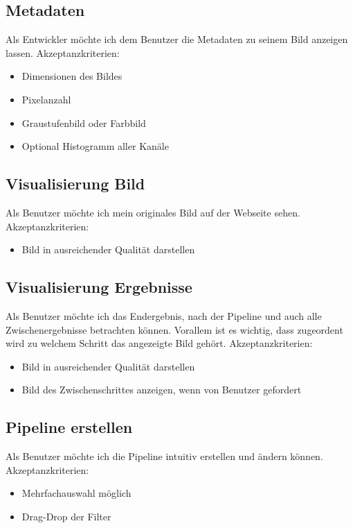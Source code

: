\documentclass[conference]{IEEEtran}
\begin{document}
\subsection{Metadaten}
Als Entwickler möchte ich dem Benutzer die Metadaten zu seinem Bild anzeigen lassen.
Akzeptanzkriterien: 
\begin{itemize}
	\item Dimensionen des Bildes
	\item Pixelanzahl
	\item Graustufenbild oder Farbbild
	\item Optional Histogramm aller Kanäle
\end{itemize}

\subsection{Visualisierung Bild}
Als Benutzer möchte ich mein originales Bild auf der Webseite sehen.
Akzeptanzkriterien: 
\begin{itemize}
	\item Bild in ausreichender Qualität darstellen
\end{itemize}

\subsection{Visualisierung Ergebnisse}
Als Benutzer möchte ich das Endergebnis, nach der Pipeline und auch alle Zwischenergebnisse betrachten können. Vorallem ist es wichtig, dass zugeordent wird zu welchem Schritt das angezeigte Bild gehört.
Akzeptanzkriterien: 
\begin{itemize}
	\item Bild in ausreichender Qualität darstellen
	\item Bild des Zwischenschrittes anzeigen, wenn von Benutzer gefordert
\end{itemize}

\subsection{Pipeline erstellen}
Als Benutzer möchte ich die Pipeline intuitiv erstellen und ändern können.
Akzeptanzkriterien:
\begin{itemize}
	\item Mehrfachauswahl möglich
	\item Drag-Drop der Filter
\end{itemize}
\end{document}
